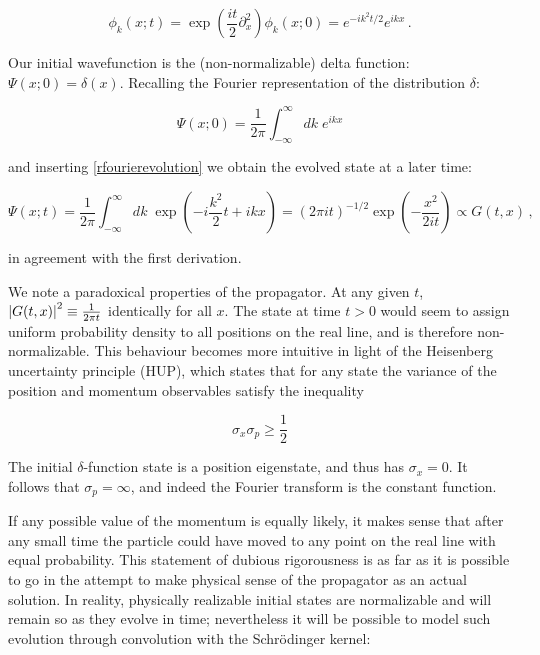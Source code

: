 \documentclass{article}
\begin{document}
\begin{equation}
    \label{rfourierevolution}
    \phi_k(x; t) = \exp(\frac{it}{2}\partial_x^2) \phi_k(x;0) = e^{-ik^{2}t/2} e^{ikx}\,.
\end{equation}

Our initial wavefunction is the (non-normalizable) delta function: $\Psi(x;0) = \delta(x)$. Recalling the Fourier representation of the distribution $\delta$:

\begin{equation}
    \Psi(x;0) = \frac{1}{2\pi} \int_{-\infty}^\infty dk \; e^{ikx} 
\end{equation}

and inserting \eqref{rfourierevolution} we obtain the evolved state at a later time:

\begin{equation}
    \Psi(x;t) = \frac{1}{2\pi} \int_{-\infty}^{\infty} dk \; \exp( - i \frac{k^2}{2}t +  ikx ) = (2 \pi i t)^{-1/2} \exp(-\frac{x^2}{2it}) \propto G(t,x)\,,
\end{equation}

in agreement with the first derivation.

We note a paradoxical properties of the propagator. At any given $t$, $\abs{G(t,x)}^2 \equiv \frac{1}{2\pi t}$ identically for all $x$. The state at time $t>0$ would seem to assign uniform probability density to all positions on the real line, and is therefore non-normalizable. This behaviour becomes more intuitive in light of the Heisenberg uncertainty principle (HUP), which states that for any state the variance of the position and momentum observables satisfy the inequality

\begin{equation}
    \sigma_x \sigma_p \geq \frac{1}{2}
\end{equation}

The initial $\delta$-function state is a position eigenstate, and thus has $\sigma_x = 0$. It follows that $\sigma_p = \infty$, and indeed the Fourier transform is the constant function.

If any possible value of the momentum is equally likely, it makes sense that after any small time the particle could have moved to any point on the real line with equal probability. This statement of dubious rigorousness is as far as it is possible to go in the attempt to make physical sense of the propagator as an actual solution. In reality, physically realizable initial states are normalizable and will remain so as they evolve in time; nevertheless it will be possible to model such evolution through convolution with the Schr\"odinger kernel:
\end{document}
